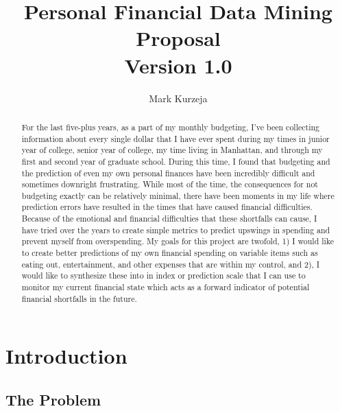 \documentclass[11pt,a4paper]{article}
\title{Personal Financial Data Mining Proposal \\ {\small Version 1.0}}
\author{Mark Kurzeja}
\date{}
\begin{document}
\maketitle
\begin{abstract}

For the last five-plus years, as a part of my monthly budgeting, I've been collecting information about every single dollar that I have ever spent during my times in junior year of college, senior year of college, my time living in Manhattan, and through my first and second year of graduate school. During this time, I found that budgeting and the prediction of even my own personal finances have been incredibly difficult and sometimes downright frustrating. While most of the time, the consequences for not budgeting exactly can be relatively minimal, there have been moments in my life where prediction errors have resulted in the times that have caused financial difficulties. Because of the emotional and financial difficulties that these shortfalls can cause, I have tried over the years to create simple metrics to predict upswings in spending and prevent myself from overspending. My goals for this project are twofold, 1) I would like to create better predictions of my own financial spending on variable items such as eating out, entertainment, and other expenses that are within my control, and 2), I would like to synthesize these into in index or prediction scale that I can use to monitor my current financial state which acts as a forward indicator of potential financial shortfalls in the future.
  
\end{abstract}

\section{Introduction}

\subsection{The Problem}
\end{document}
